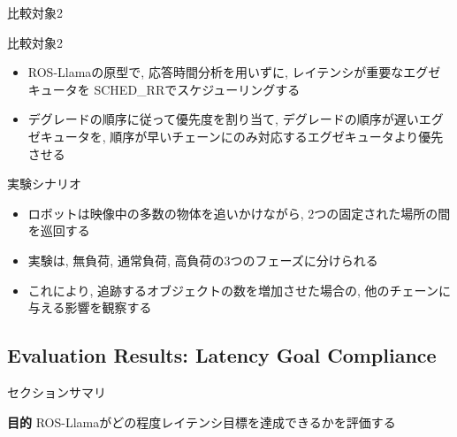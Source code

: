 \begin{frame}{比較対象2}
    \begin{block}{比較対象2}
        \begin{itemize}
            \item ROS-Llamaの原型で, 応答時間分析を用いずに, レイテンシが重要なエグゼキュータを SCHED\_RRでスケジューリングする
            \item デグレードの順序に従って優先度を割り当て, デグレードの順序が遅いエグゼキュータを, 順序が早いチェーンにのみ対応するエグゼキュータより優先させる
        \end{itemize}
    \end{block}
\end{frame}



\begin{frame}{実験シナリオ}
    \begin{itemize}
        \item ロボットは映像中の多数の物体を追いかけながら, 2つの固定された場所の間を巡回する
        \item 実験は, 無負荷, 通常負荷, 高負荷の3つのフェーズに分けられる
        \item これにより, 追跡するオブジェクトの数を増加させた場合の, 他のチェーンに与える影響を観察する
    \end{itemize}
\end{frame}


\subsection{Evaluation Results: Latency Goal Compliance}
\label{ssec: evaluation results: latency goal compliance}

\begin{frame}{セクションサマリ}
    \begin{itembox}[l]{\textbf{目的}}
        ROS-Llamaがどの程度レイテンシ目標を達成できるかを評価する
    \end{itembox}
\end{frame}

